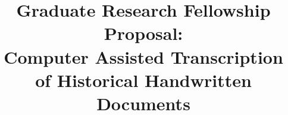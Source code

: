 \documentclass[conference]{IEEEtran}
\begin{document}
%
\title{Graduate Research Fellowship Proposal:\\Computer Assisted Transcription of Historical Handwritten Documents}


\author{
}


% 




\end{document}
